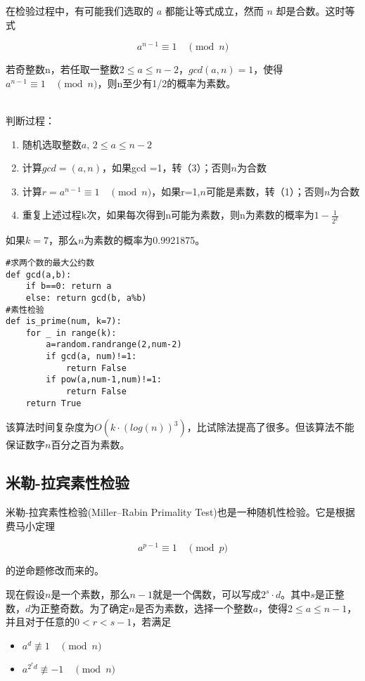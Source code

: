 \documentclass{article}
\begin{document}
在检验过程中，有可能我们选取的 $a$ 都能让等式成立，然而 $n$ 却是合数。这时等式

$$a^{n - 1} \equiv 1 \quad \pmod{n}$$

若奇整数n，若任取一整数$2 \leq a \leq n-2$，$gcd(a,n)= 1$，使得$a^{n - 1} \equiv 1 \quad \pmod{n}$，则n至少有1/2的概率为素数。

~\\

判断过程：
\begin{enumerate}
\item 随机选取整数$a$, $2 \leq a \leq n-2$
\item 计算$gcd=(a, n)$，如果gcd =1，转（3）；否则$n$为合数
\item 计算$r = a^{n - 1} \equiv 1 \quad \pmod{n}$，如果r=1,$n$可能是素数，转（1）；否则$n$为合数
\item 重复上述过程k次，如果每次得到n可能为素数，则n为素数的概率为$1 - \frac{1}{2^k}$
\end{enumerate}

如果$k = 7$，那么$n$为素数的概率为0.9921875。


\begin{lstlisting}
#求两个数的最大公约数
def gcd(a,b):
    if b==0: return a
    else: return gcd(b, a%b)
#素性检验
def is_prime(num, k=7):
    for _ in range(k):
        a=random.randrange(2,num-2)
        if gcd(a, num)!=1:
            return False
        if pow(a,num-1,num)!=1:
            return False
    return True
\end{lstlisting}

该算法时间复杂度为$O(k \cdot (log(n))^3)$，比试除法提高了很多。但该算法不能保证数字$n$百分之百为素数。

\subsection{米勒-拉宾素性检验}

米勒-拉宾素性检验(Miller–Rabin Primality Test)也是一种随机性检验。它是根据费马小定理

$$a^{p - 1} \equiv 1 \quad \pmod{p}$$

的逆命题修改而来的。

现在假设$n$是一个素数，那么$n-1$就是一个偶数，可以写成$2^s \cdot d$。其中$s$是正整数，$d$为正整奇数。为了确定$n$是否为素数，选择一个整数$a$，使得$2 \le a \le n-1$， 并且对于任意的$0 < r < s- 1$，若满足

\begin{itemize}
\item $a^{d} \not \equiv 1 \quad \pmod{n}$ 
\item $a^{2^{r} d} \not \equiv-1 \quad \pmod{n}$
\end{itemize}
\end{document}
